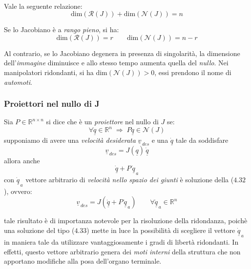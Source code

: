 \paragraph{}
Vale la seguente relazione:
\begin{equation}
	\text{dim}(\mathcal{R}(J)) + \text{dim}(\mathcal{N}(J)) = n
\end{equation}

Se lo Jacobiano è a \emph{rango pieno}, si ha: 
\begin{equation}
	\text{dim}(\mathcal{R}(J)) = r \qquad \text{dim}(\mathcal{N}(J)) = n-r
\end{equation}

Al contrario, se lo Jacobiano degenera in presenza di singolarità, la dimensione dell'\emph{immagine} diminuisce e allo stesso tempo aumenta quella del \emph{nullo}. Nei manipolatori ridondanti, si ha $\text{dim}(\mathcal{N}(J))>0$, essi prendono il nome di \emph{automoti}.

\subsubsection{Proiettori nel nullo di J}
Sia $P\in\mathbb{R}^{n \times n}$ si dice che è un \emph{proiettore} nel nullo di $J$ se: 
\begin{equation}
	\forall\underline{\dot{q}}\in\mathbb{R}^n \;\Rightarrow\; P\underline{\dot{q}}\in\mathcal{N}(J)
\end{equation}
supponiamo di avere una \emph{velocità desiderata} $\underline{v}_{\,des}$ e una $\underline{\dot{q}}$ tale da soddisfare 
\begin{equation}
	\underline{v}_{\,des} = J(\underline{q})\,\underline{\dot{q}}
\end{equation}
allora anche 
\begin{equation}
	\underline{\dot{q}} + P\,\underline{\dot{q}}_{\,a}
\end{equation}
con $\underline{\dot{q}}_{\,a}$ vettore arbitrario di \emph{velocità nello spazio dei giunti} è soluzione della ($4.32$), ovvero: 
\begin{equation}
	\underline{v}_{\,des} = J(\underline{\dot{q}} + P\,\underline{\dot{q}}_{\,a}) \qquad \forall \underline{\dot{q}}_{\,a}\in\mathbb{R}^n
\end{equation}

tale risultato è di importanza notevole per la risoluzione della ridondanza, poichè una soluzione del tipo ($4.33$) mette in luce la possibilità di scegliere il vettore $\underline{\dot{q}}_{\,a}$ in maniera tale da utilizzare vantaggiosamente i gradi di libertà ridondanti. In effetti, questo vettore arbitrario genera dei \emph{moti interni} della struttura che non apportano modifiche alla posa dell'organo terminale.

